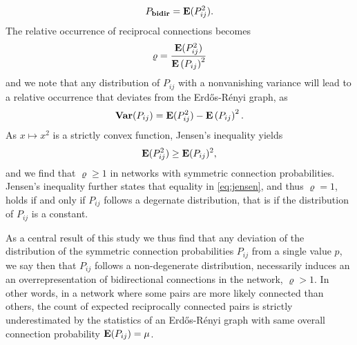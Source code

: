 \begin{align}
P_{\mathbf{bidir}} = \operatorname{\mathbf{E}}(P_{ij}^2).
\end{align}
%
The relative occurrence of reciprocal connections becomes
\begin{align}
\varrho = \frac{\operatorname{\mathbf{E}}(P_{ij}^2)}{{\operatorname{\mathbf{E}}\left(P_{ij}\right)}^2}
\end{align}
and we note that any distribution of $P_{ij}$ with a nonvanishing variance will lead to a relative occurrence that deviates from the Erd\H{o}s-R\'{e}nyi graph, as
\begin{align}
\operatorname{\mathbf{Var}}(P_{ij}) = \operatorname{\mathbf{E}}(P_{ij}^2) - \operatorname{\mathbf{E}}\left(P_{ij}\right)^2.
\end{align}
As $x \mapsto x^2$ is a strictly convex function, Jensen's inequality \cite{Jensen1906, Cover2006} yields
\begin{align}
\operatorname{\mathbf{E}}(P_{ij}^2) \geq \operatorname{\mathbf{E}}(P_{ij})^2, \label{eq:jensen}
\end{align}
and we find that $\varrho \geq 1$ in networks with symmetric connection probabilities. Jensen's inequality further states that equality in \eqref{eq:jensen}, and thus $\varrho = 1$, holds if and only if $P_{ij}$ follows a degernate distribution, that is if the distribution of $P_{ij}$ is a constant.

As a central result of this study we thus find that any deviation of the distribution of the symmetric connection probabilities $P_{ij}$ from a single value $p$, we say then that $P_{ij}$ follows a non-degenerate distribution, necessarily induces an an overrepresentation of bidirectional connections in the network, $\varrho > 1$. In other words, in a network where some pairs are more likely connected than others, the count of expected reciprocally connected pairs is strictly underestimated by the statistics of an Erd\H{o}s-R\'{e}nyi graph with same overall connection probability $\operatorname{\mathbf{E}}(P_{ij}) = \mu$.






